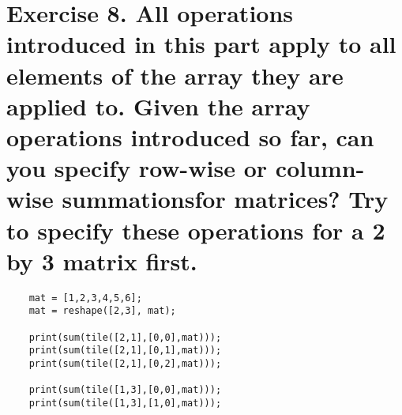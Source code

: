 \documentclass[a4paper]{article}
\begin{document}
\section*{Exercise 8. All operations introduced in this part apply to all elements of the array they are applied to. Given the array operations introduced so far, can you specify row-wise or column-wise summationsfor matrices? Try to specify these operations for a 2 by 3 matrix first.}
\begin{verbatim}
    mat = [1,2,3,4,5,6];
    mat = reshape([2,3], mat);

    print(sum(tile([2,1],[0,0],mat)));
    print(sum(tile([2,1],[0,1],mat)));
    print(sum(tile([2,1],[0,2],mat)));

    print(sum(tile([1,3],[0,0],mat)));
    print(sum(tile([1,3],[1,0],mat)));
\end{verbatim}
\end{document}
